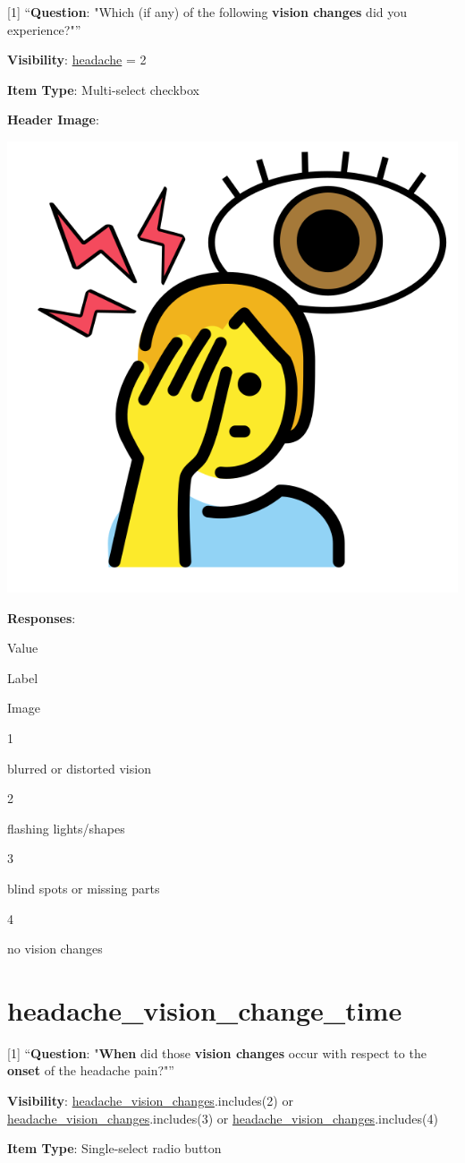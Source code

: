 \documentclass[]{book}
\begin{document}
{[}1{]} ``\textbf{Question}: "Which (if any) of the following \textbf{vision changes} did you experience?"''

\textbf{Visibility}: \protect\hyperlink{headache}{headache} = 2

\textbf{Item Type}: Multi-select checkbox

\textbf{Header Image}:

\begin{flushleft}\includegraphics[width=0.33\linewidth]{downloadFigs4latex_NIMH_Applet_Codebook/headache_vision_changes_headerImg} \end{flushleft}

\textbf{Responses}:

Value

Label

Image

1

blurred or distorted vision

2

flashing lights/shapes

3

blind spots or missing parts

4

no vision changes

\hypertarget{headache_vision_change_time}{%
\section{headache\_vision\_change\_time}\label{headache_vision_change_time}}

{[}1{]} ``\textbf{Question}: "\textbf{When} did those \textbf{vision changes} occur with respect to the \textbf{onset} of the headache pain?"''

\textbf{Visibility}: \protect\hyperlink{headache_vision_changes}{headache\_vision\_changes}.includes(2) or \protect\hyperlink{headache_vision_changes}{headache\_vision\_changes}.includes(3) or \protect\hyperlink{headache_vision_changes}{headache\_vision\_changes}.includes(4)

\textbf{Item Type}: Single-select radio button
\end{document}
